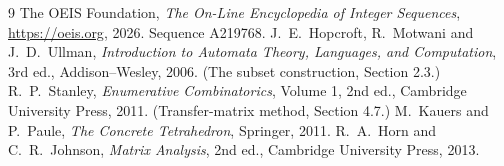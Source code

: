\documentclass[11pt,a4paper]{article}
\theoremstyle{plain}
\theoremstyle{definition}
\begin{document}
\begin{thebibliography}{9}
 The OEIS Foundation, \emph{The On-Line Encyclopedia of Integer
Sequences}, \url{https://oeis.org}, 2026. Sequence A219768.
 J.~E.~Hopcroft, R.~Motwani and J.~D.~Ullman, \emph{Introduction to Automata
Theory, Languages, and Computation}, 3rd ed., Addison--Wesley, 2006. (The subset
construction, Section 2.3.)
 R.~P.~Stanley, \emph{Enumerative Combinatorics}, Volume 1, 2nd ed.,
Cambridge University Press, 2011. (Transfer-matrix method, Section 4.7.)
 M.~Kauers and P.~Paule, \emph{The Concrete Tetrahedron}, Springer, 2011.
 R.~A.~Horn and C.~R.~Johnson, \emph{Matrix Analysis}, 2nd ed., Cambridge
University Press, 2013.
\end{thebibliography}
\end{document}
